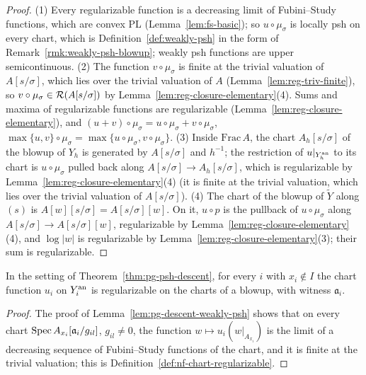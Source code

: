 \begin{proof}
(1) Every regularizable function is a decreasing limit of Fubini--Study functions, which are convex PL
(Lemma~\ref{lem:fs-basic}); so $u\circ\mu_\sigma$ is locally psh on every chart, which is
Definition~\ref{def:weakly-psh} in the form of Remark~\ref{rmk:weakly-psh-blowup}; weakly psh functions are upper
semicontinuous. (2) The function $v\circ\mu_\sigma$ is finite at the trivial valuation of $A[s/\sigma]$, which lies over
the trivial valuation of $A$ (Lemma~\ref{lem:reg-triv-finite}), so $v\circ\mu_\sigma\in\mathcal{R}(A[s/\sigma])$ by
Lemma~\ref{lem:reg-closure-elementary}(4). Sums and maxima of regularizable functions are regularizable
(Lemma~\ref{lem:reg-closure-elementary}), and $(u+v)\circ\mu_\sigma=u\circ\mu_\sigma+v\circ\mu_\sigma$,
$\max\{u,v\}\circ\mu_\sigma=\max\{u\circ\mu_\sigma,v\circ\mu_\sigma\}$. (3) Inside $\mathrm{Frac}\,A$, the chart
$A_h[s/\sigma]$ of the blowup of $Y_h$ is generated by $A[s/\sigma]$ and $h^{-1}$; the restriction of $u|_{Y_h^{\mathrm{an}}}$ to
its chart is $u\circ\mu_\sigma$ pulled back along $A[s/\sigma]\to A_h[s/\sigma]$, which is regularizable by
Lemma~\ref{lem:reg-closure-elementary}(4) (it is finite at the trivial valuation, which lies over the trivial valuation
of $A[s/\sigma]$). (4) The chart of the blowup of $\widetilde Y$ along $(s)$ is $A[w][s/\sigma]=A[s/\sigma][w]$. On it,
$u\circ p$ is the pullback of $u\circ\mu_\sigma$ along $A[s/\sigma]\to A[s/\sigma][w]$, regularizable by
Lemma~\ref{lem:reg-closure-elementary}(4), and $\log|w|$ is regularizable by Lemma~\ref{lem:reg-closure-elementary}(3);
their sum is regularizable.
\end{proof}

\begin{lemma}\label{lem:nf-descent-chart}
\leanok
{}
In the setting of Theorem~\ref{thm:pg-psh-descent}, for every $i$ with $x_i\notin I$ the chart function $u_i$ on
$Y_i^{\mathrm{an}}$ is regularizable on the charts of a blowup, with witness $\mathfrak a_i$.
\end{lemma}

\begin{proof}
The proof of Lemma~\ref{lem:pg-descent-weakly-psh} shows that on every chart
$\operatorname{Spec} A_{x_i}[\mathfrak a_i/g_{il}]$, $g_{il}\ne0$, the function $w\mapsto u_i(w|_{A_{x_i}})$ is the limit of a
decreasing sequence of Fubini--Study functions of the chart, and it is finite at the trivial valuation; this is
Definition~\ref{def:nf-chart-regularizable}.
\end{proof}

